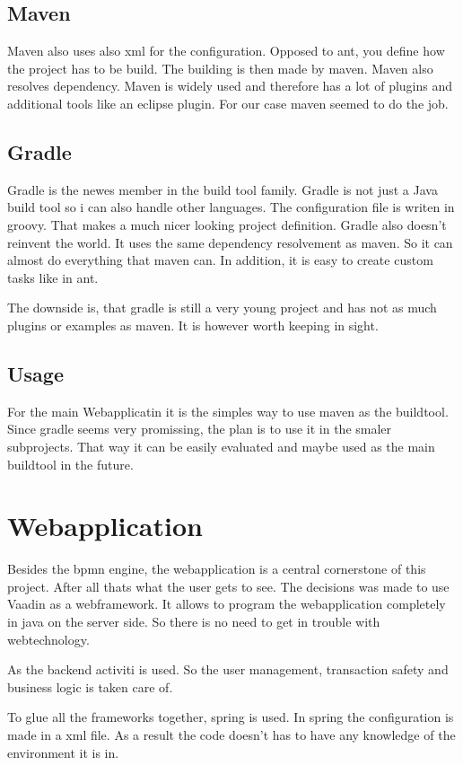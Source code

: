\documentclass[paper=a4,twoside=false,BCOR=0mm,DIV=calc,fontsize=12pt]{scrartcl}
\begin{document}
\subsection{Maven}
Maven also uses also xml for the configuration. Opposed to ant, you define how the project has to be build. The building is then
made by maven. Maven also resolves dependency. Maven is widely used and therefore has a lot of plugins and additional tools like an eclipse plugin. For our case maven seemed to do the job.


\subsection{Gradle}
Gradle is the newes member in the build tool family. Gradle is not just a Java build tool so i can also handle other languages. The configuration file is writen in groovy. That makes a much nicer looking project definition.
Gradle also doesn't reinvent the world. It uses the same dependency resolvement as maven. So it can almost do everything that maven can. In addition, it is easy to create custom tasks like in ant.

The downside is, that gradle is still a very young project and has not as much plugins or examples as maven. It is however worth keeping in sight.

\subsection{Usage}
For the main Webapplicatin it is the simples way to use maven as the buildtool. Since gradle seems very promissing, the plan is to use it in the smaler subprojects. That way it can be easily evaluated and maybe used as the main buildtool in the future.


\section{Webapplication}
Besides the bpmn engine, the webapplication is a central cornerstone of this project. After all thats what the user gets to see.
The decisions was made to use Vaadin as a webframework. It allows to program the webapplication completely in java on the server side. So there is no need to get in trouble with webtechnology.

As the backend activiti is used. So the user management, transaction safety and business logic is taken care of.

To glue all the frameworks together, spring is used. In spring the configuration is made in a xml file. As a result the code doesn't has to have any knowledge of the environment it is in.
\end{document}
